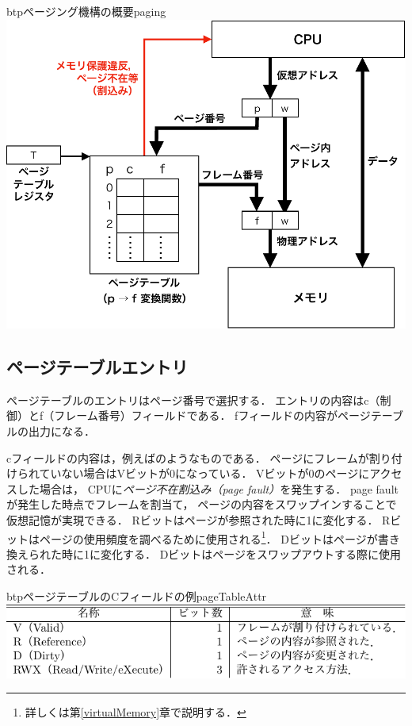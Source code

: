 \begin{myfig}{btp}{ページング機構の概要}{paging}
  \includegraphics[scale=0.66]{Fig/paging-crop.pdf}
\end{myfig}

\subsection{ページテーブルエントリ}
ページテーブルのエントリはページ番号で選択する．
エントリの内容はc（制御）とf（フレーム番号）フィールドである．
fフィールドの内容がページテーブルの出力になる．

cフィールドの内容は，例えばのようなものである．
ページにフレームが割り付けられていない場合はVビットが0になっている．
Vビットが0のページにアクセスした場合は，
CPUに\emph{ページ不在割込み（page fault）}を発生する．
page fault が発生した時点でフレームを割当て，
ページの内容をスワップインすることで仮想記憶が実現できる．
Rビットはページが参照された時に1に変化する．
Rビットはページの使用頻度を調べるために使用される\footnote{
  詳しくは第\ref{virtualMemory}章で説明する．}．
Dビットはページが書き換えられた時に1に変化する．
Dビットはページをスワップアウトする際に使用される．

\begin{mytable}{btp}{ページテーブルのCフィールドの例}{pageTableAttr}
  \includegraphics[scale=1.0]{Tbl/pageTableAttr.pdf}
\end{mytable}

